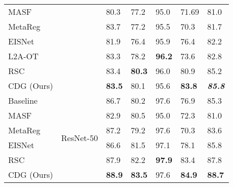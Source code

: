 \begin{table*}[htb]
\begin{center}
\begin{tabularx}{0.9\textwidth}{p{}<{\centering}|p{}<{\centering}|p{}<{\centering}|p{}<{\centering}|p{}<{\centering}|p{}<{\centering}|X<{\centering}}
      MASF \citep{dou2019domain}        &                           & 80.3          & 77.2          & 95.0          & 71.69         & 81.0                   \\
      MetaReg \citep{balaji2018metareg} &                           & 83.7          & 77.2          & 95.5          & 70.3          & 81.7                   \\
      EISNet \citep{wang2020learning}   &                           & 81.9          & 76.4          & 95.9          & 76.4          & 82.2                   \\
      L2A-OT \citep{zhou2020learning}   &                           & 83.3          & 78.2          & \textbf{96.2} & 73.6          & 82.8                   \\
      RSC \citep{huangRSC2020}          &                           & 83.4          & \textbf{80.3} & 96.0          & 80.9          & 85.2                   \\
      CDG (Ours)                       &                           & \textbf{83.5} & 80.1          & 95.6          & \textbf{83.8} & \textit{\textbf{85.8}} \\

      \midrule[0.4pt]

      Baseline                         & \multirow{6}{*}{ResNet-50}
                                       & 86.7                      & 80.2          & 97.6          & 76.9          & 85.3                                   \\
      MASF \citep{dou2019domain}        &                           & 82.9          & 80.5          & 95.0          & 72.3          & 81.0                   \\
      MetaReg \citep{balaji2018metareg} &                           & 87.2          & 79.2          & 97.6          & 70.3          & 83.6                   \\
      EISNet \citep{wang2020learning}   &                           & 86.6          & 81.5          & 97.1          & 78.1          & 85.8                   \\
      RSC \citep{huangRSC2020}          &                           & 87.9          & 82.2          & \textbf{97.9} & 83.4          & 87.8                   \\
      CDG (Ours)                       &                           & \textbf{88.9} & \textbf{83.5} & 97.6          & \textbf{84.9} & \textbf{88.7}          \\

      \bottomrule[0.6pt]
    \end{tabularx}
  \end{center}
\end{table*}

